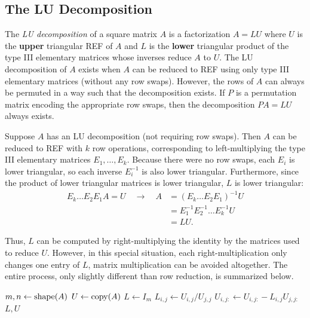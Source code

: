 \subsection*{The LU Decomposition} %

The \emph{LU decomposition} of a square matrix $A$ is a factorization $A=LU$ where $U$ is the \textbf{upper} triangular REF of $A$ and $L$ is the \textbf{lower} triangular product of the type III elementary matrices whose inverses reduce $A$ to $U$.
The LU decomposition of $A$ exists when $A$ can be reduced to REF using only type III elementary matrices (without any row swaps).
However, the rows of $A$ can always be permuted in a way such that the decomposition exists.
If $P$ is a permutation matrix encoding the appropriate row swaps, then the decomposition $PA = LU$ always exists.

Suppose $A$ has an LU decomposition (not requiring row swaps).
Then $A$ can be reduced to REF with $k$ row operations, corresponding to left-multiplying the type III elementary matrices $E_1, \ldots, E_k$.
Because there were no row swaps, each $E_i$ is lower triangular, so each inverse $E_i^{-1}$ is also lower triangular.
Furthermore, since the product of lower triangular matrices is lower triangular, $L$ is lower triangular:
\begin{align*}
E_k\ldots E_2E_1 A = U\quad \longrightarrow\quad A &= (E_k \ldots E_2E_1)^{-1} U \\
&= E_1^{-1}E_2^{-1}\ldots E_k^{-1}U \\
&= LU.
\end{align*}

Thus, $L$ can be computed by right-multiplying the identity by the matrices used to reduce $U$.
However, in this special situation, each right-multiplication only changes one entry of $L$, matrix multiplication can be avoided altogether.
The entire process, only slightly different than row reduction, is summarized below. %
%
\begin{algorithm}[H]
\begin{algorithmic}[1]
    \State $m, n \gets \mathrm{shape}(A)$
    \State $U \gets \mathrm{copy}(A)$
    \State $L \gets I_m$
            \State $L_{i,j} \gets U_{i, j}/U_{j, j}$
            \State $U_{i,j:} \gets U_{i,j:} - L_{i,j}U_{j,j:}$
        \EndFor
    \EndFor
    \State {} $L, U$
\EndProcedure
\end{algorithmic}
\caption{}
\label{alg:LU-Decomposition}
\end{algorithm}

